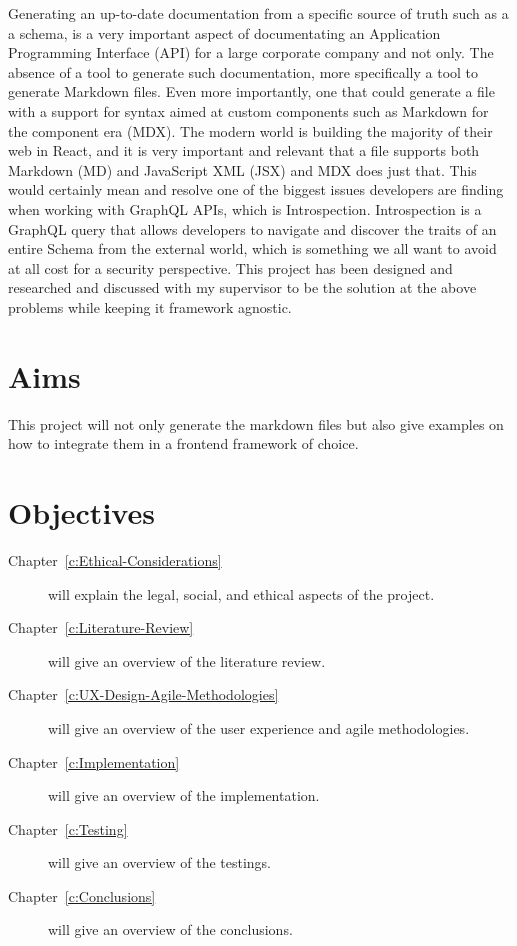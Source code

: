 Generating an up-to-date documentation from a specific source of truth such as a
a schema, is a very important aspect of documentating an Application Programming
Interface (API) for a large corporate company and not only. The absence of a
tool to generate such documentation, more specifically a tool to generate
Markdown files. Even more importantly, one that could generate a file with a
support for syntax aimed at custom components such as Markdown for the component
era (MDX). The modern world is building the majority of their web in React, and
it is very important and relevant that a file supports both Markdown (MD) and
JavaScript XML (JSX) and MDX does just that. This would certainly mean and
resolve one of the biggest issues developers are finding when working with
GraphQL APIs, which is Introspection. Introspection is a GraphQL query that
allows developers to navigate and discover the traits of an entire Schema from
the external world, which is something we all want to avoid at all cost for a
security perspective. This project has been designed and researched and
discussed with my supervisor to be the solution at the above problems while
keeping it framework agnostic.

\section{Aims}
\label{s:Aim}

This project will not only generate the markdown files but also give examples on
how to integrate them in a frontend framework of choice.

\section{Objectives}
\label{s:Objectives}

\begin{description}


  \item[Chapter~\ref{c:Ethical-Considerations}] will explain the legal, social, and ethical aspects of the project.

  \item[Chapter~\ref{c:Literature-Review}] will give an overview of the literature review.

  \item[Chapter~\ref{c:UX-Design-Agile-Methodologies}] will give an overview of the user experience and agile methodologies.

  \item[Chapter~\ref{c:Implementation}] will give an overview of the implementation.

  \item[Chapter~\ref{c:Testing}] will give an overview of the testings.

  \item[Chapter~\ref{c:Conclusions}] will give an overview of the conclusions.

\end{description}
